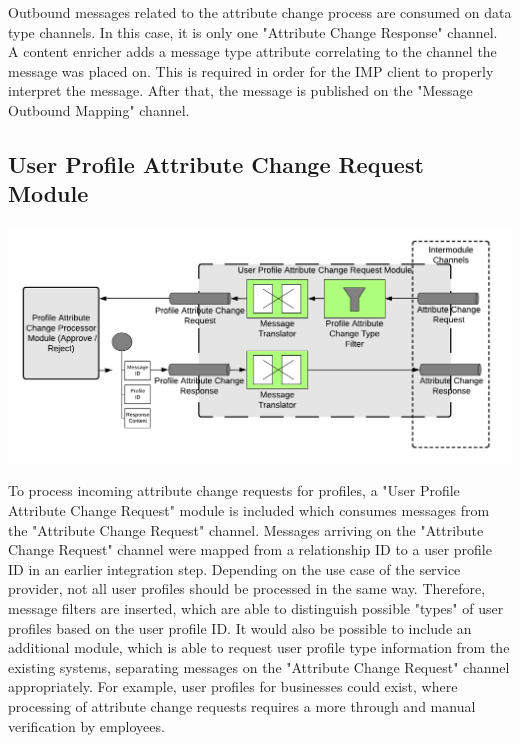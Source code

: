 Outbound messages related to the attribute change process are consumed on data type channels. In this case, it is only one "Attribute Change Response" channel. A content enricher adds a message type attribute correlating to the channel the message was placed on. This is required in order for the IMP client to properly interpret the message. After that, the message is published on the "Message Outbound Mapping" channel.

\subsection{User Profile Attribute Change Request Module}

\begin{center}
    \includegraphics[scale=0.6]{Diagrams/Integration Architecture 1/Technological Integration/12. Attribute Change Request Module.pdf}
\end{center}

To process incoming attribute change requests for profiles, a "User Profile Attribute Change Request" module is included which consumes messages from the "Attribute Change Request" channel. Messages arriving on the "Attribute Change Request" channel were mapped from a relationship ID to a user profile ID in an earlier integration step. Depending on the use case of the service provider, not all user profiles should be processed in the same way. Therefore, message filters are inserted, which are able to distinguish possible "types" of user profiles based on the user profile ID. It would also be possible to include an additional module, which is able to request user profile type information from the existing systems, separating messages on the "Attribute Change Request" channel appropriately. For example, user profiles for businesses could exist, where processing of attribute change requests requires a more through and manual verification by employees. 

